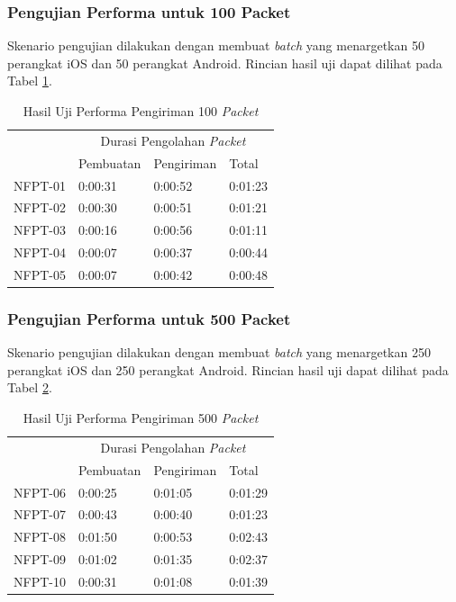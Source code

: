 \subsubsection{Pengujian Performa untuk 100 Packet}
\par Skenario pengujian dilakukan dengan membuat \textit{batch} yang menargetkan 50 perangkat iOS dan 50 perangkat Android. Rincian hasil uji dapat dilihat pada Tabel \ref{t:performa-100}.

\begin{longtable}{|p{1.5cm}|p{2cm}|p{2cm}|p{2cm}|}
	\caption{Hasil Uji Performa Pengiriman 100 \textit{Packet}} \label{t:performa-100} \\ \hline
	\rowcolor{lightgray} & \multicolumn{3}{c|}{Durasi Pengolahan \textit{Packet}} \\ \hhline{~|*3{-}|}
	\rowcolor{lightgray} \multirow{-2}{*}{Kode} & Pembuatan & Pengiriman & Total \\ \hline
	\endhead
	NFPT-01 & 0:00:31 & 0:00:52 & 0:01:23 \\ \hline 
	NFPT-02 & 0:00:30 & 0:00:51 & 0:01:21 \\ \hline
	NFPT-03 & 0:00:16 & 0:00:56 & 0:01:11 \\ \hline
	NFPT-04 & 0:00:07 & 0:00:37 & 0:00:44 \\ \hline
	NFPT-05 & 0:00:07 & 0:00:42 & 0:00:48 \\ \hline
\end{longtable}


\subsubsection{Pengujian Performa untuk 500 Packet}
\par Skenario pengujian dilakukan dengan membuat \textit{batch} yang menargetkan 250 perangkat iOS dan 250 perangkat Android. Rincian hasil uji dapat dilihat pada Tabel \ref{t:performa-500}.

\begin{longtable}{|p{1.5cm}|p{2cm}|p{2cm}|p{2cm}|}
	\caption{Hasil Uji Performa Pengiriman 500 \textit{Packet}} \label{t:performa-500} \\ \hline
	\rowcolor{lightgray} & \multicolumn{3}{c|}{Durasi Pengolahan \textit{Packet}} \\ \hhline{~|*3{-}|}
	\rowcolor{lightgray} \multirow{-2}{*}{Kode} & Pembuatan & Pengiriman & Total \\ \hline
	\endhead
	NFPT-06 & 0:00:25 & 0:01:05 & 0:01:29 \\ \hline 
	NFPT-07 & 0:00:43 & 0:00:40 & 0:01:23 \\ \hline
	NFPT-08 & 0:01:50 & 0:00:53 & 0:02:43 \\ \hline
	NFPT-09 & 0:01:02 & 0:01:35 & 0:02:37 \\ \hline
	NFPT-10 & 0:00:31 & 0:01:08 & 0:01:39 \\ \hline
\end{longtable}

